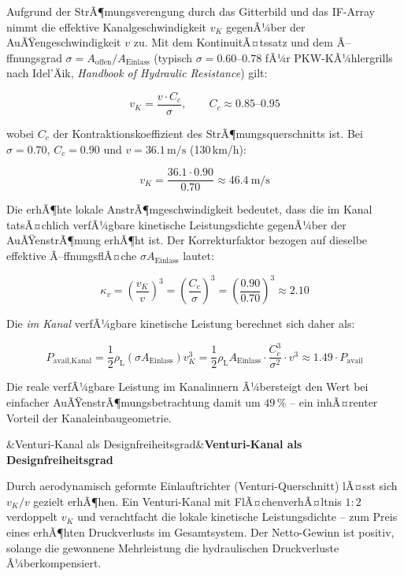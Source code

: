 ﻿\documentclass[12pt, a4paper]{report}
\newenvironment{hinweis}[1][]{%
  \begin{hinweisframe}\sloppy%
  \ifx&#1&\else\textbf{#1}\par\smallskip\fi}{\end{hinweisframe}}
\theoremstyle{definition}
\theoremstyle{remark}
\newcommand{\rhoL}{\rho_{\text{L}}}
\newcommand{\Aeinlass}{A_{\text{Einlass}}}
\begin{document}
Aufgrund der StrÃ¶mungsverengung durch das Gitterbild und das IF-Array nimmt
die effektive Kanalgeschwindigkeit $v_K$ gegenÃ¼ber der AuÃŸengeschwindigkeit $v$
zu. Mit dem KontinuitÃ¤tssatz und dem Ã–ffnungsgrad $\sigma = A_{\text{offen}}/\Aeinlass$
(typisch $\sigma = 0.60$--$0.78$ fÃ¼r PKW-KÃ¼hlergrills nach Idel'Äik,
\emph{Handbook of Hydraulic Resistance}) gilt:

\begin{equation}
  v_K = \frac{v \cdot C_c}{\sigma}, \qquad C_c \approx 0.85\text{--}0.95
  \label{eq:v_kanal}
\end{equation}

wobei $C_c$ der Kontraktionskoeffizient des StrÃ¶mungsquerschnitts ist.
Bei $\sigma = 0.70$, $C_c = 0.90$ und $v = 36.1\,\text{m/s}$ (130\,km/h):

\begin{equation}
  v_K = \frac{36.1 \cdot 0.90}{0.70} \approx \SI{46.4}{\metre\per\second}
  \label{eq:v_kanal_130}
\end{equation}

Die erhÃ¶hte lokale AnstrÃ¶mgeschwindigkeit bedeutet, dass die im Kanal tatsÃ¤chlich
verfÃ¼gbare kinetische Leistungsdichte gegenÃ¼ber der AuÃŸenstrÃ¶mung erhÃ¶ht ist.
Der Korrekturfaktor bezogen auf dieselbe effektive Ã–ffnungsflÃ¤che
$\sigma \Aeinlass$ lautet:

\begin{equation}
  \kappa_v = \left(\frac{v_K}{v}\right)^3 = \left(\frac{C_c}{\sigma}\right)^3
           = \left(\frac{0.90}{0.70}\right)^3 \approx 2.10
  \label{eq:kappa_v}
\end{equation}

Die \emph{im Kanal} verfÃ¼gbare kinetische Leistung berechnet sich daher als:

\begin{equation}
  P_{\text{avail,Kanal}} = \frac{1}{2}\rhoL (\sigma \Aeinlass) v_K^3
  = \frac{1}{2}\rhoL \Aeinlass \cdot \frac{C_c^3}{\sigma^2} \cdot v^3
  \approx 1.49 \cdot P_{\text{avail}}
  \label{eq:p_kanal_korr}
\end{equation}

Die reale verfÃ¼gbare Leistung im Kanalinnern Ã¼bersteigt den Wert bei einfacher
AuÃŸenstrÃ¶mungsbetrachtung damit um $49\,\%$ -- ein inhÃ¤renter Vorteil der
Kanaleinbaugeometrie.

\begin{hinweis}[Venturi-Kanal als Designfreiheitsgrad]
  Durch aerodynamisch geformte Einlauftrichter (Venturi-Querschnitt) lÃ¤sst
  sich $v_K/v$ gezielt erhÃ¶hen. Ein Venturi-Kanal mit FlÃ¤chenverhÃ¤ltnis $1:2$
  verdoppelt $v_K$ und verachtfacht die lokale kinetische Leistungsdichte --
  zum Preis eines erhÃ¶hten Druckverlusts im Gesamtsystem. Der Netto-Gewinn
  ist positiv, solange die gewonnene Mehrleistung die hydraulischen
  Druckverluste Ã¼berkompensiert.
\end{hinweis}
\end{document}
